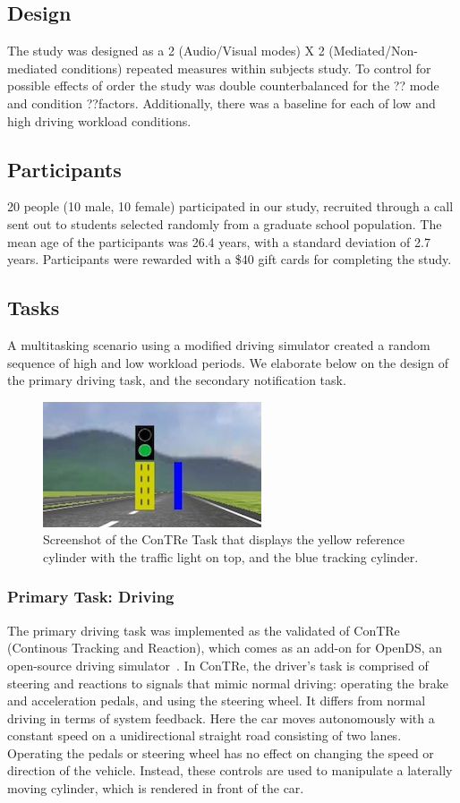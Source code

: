 \subsection{Design}
The study was designed as a 2 (Audio/Visual modes) X 2 (Mediated/Non-mediated conditions) repeated measures within subjects study. To control for possible effects of order the study was double counterbalanced for the ?? mode and condition ??factors. Additionally, there was a baseline for each of low and high driving workload conditions. 

\subsection{Participants}
20 people (10 male, 10 female) participated in our study, recruited through a call sent out to students selected randomly from a graduate school population. The mean age of the participants was 26.4 years, with a standard deviation of 2.7 years. Participants were rewarded with a \$40 gift cards for completing the study.

\subsection{Tasks}
A multitasking scenario using a modified driving simulator created a random sequence of high and low workload periods. We elaborate below on the design of the primary driving task, and the secondary notification task.

\begin{figure}
\centering
\includegraphics[scale=.8]{sim}
\caption{Screenshot of the ConTRe Task that displays the yellow reference cylinder with the traffic light on top, and the blue tracking cylinder.}
\label{fig:my_label}
\end{figure}

\subsubsection{Primary Task: Driving}
The primary driving task was implemented as the validated  of ConTRe (Continous Tracking and Reaction), which comes as an add-on for OpenDS, an open-source driving simulator~\cite{mahr2012}.  In ConTRe, the driver's task is comprised of steering and reactions to signals that mimic normal driving: operating the brake and acceleration pedals, and using the steering wheel. It differs from normal driving in terms of system feedback. Here the car moves autonomously with a constant speed on a unidirectional straight road consisting of two lanes. Operating the pedals or steering wheel has no effect on changing the speed or direction of the vehicle. Instead, these controls are used to manipulate a laterally moving cylinder, which is rendered in front of the car. 

